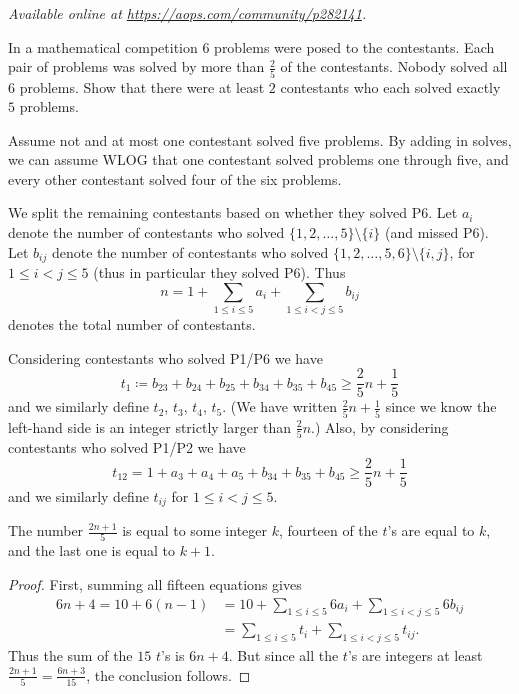 
\textsl{Available online at \url{https://aops.com/community/p282141}.}
\begin{mdframed}[style=mdpurplebox,frametitle={Problem statement}]
In a mathematical competition $6$ problems were posed to the contestants.
Each pair of problems was solved by more than $\frac{2}{5}$ of the contestants.
Nobody solved all 6 problems.
Show that there were at least $2$ contestants
who each solved exactly $5$ problems.
\end{mdframed}
Assume not and at most one contestant solved five problems.
By adding in solves,
we can assume WLOG that one contestant solved problems one through five,
and every other contestant solved four of the six problems.

We split the remaining contestants based on whether they solved P6.
Let $a_i$ denote the number of contestants who solved
$\{1,2,\dots,5\} \setminus \{i\}$ (and missed P6).
Let $b_{ij}$ denote the number of contestants who solved
$\{1,2,\dots,5,6\} \setminus \{i,j\}$, for $1 \le i < j \le 5$
(thus in particular they solved P6).
Thus
\[ n = 1 + \sum_{1 \le i \le 5} a_i + \sum_{1 \le i < j \le 5} b_{ij} \]
denotes the total number of contestants.

Considering contestants who solved P1/P6 we have
\[ t_1 \coloneqq b_{23} + b_{24} + b_{25} + b_{34} + b_{35} + b_{45} \ge \frac25n + \frac15 \]
and we similarly define $t_2$, $t_3$, $t_4$, $t_5$.
(We have written $\frac25n+\frac15$ since we know
the left-hand side is an integer strictly larger than $\frac25n$.)
Also, by considering contestants who solved P1/P2 we have
\[ t_{12} = 1 + a_{3} + a_{4} + a_{5} + b_{34} + b_{35} + b_{45}
  \ge \frac25n + \frac15 \]
and we similarly define $t_{ij}$ for $1 \le i < j \le 5$.

\begin{claim*}
  The number $\frac{2n+1}{5}$ is equal to some integer $k$,
  fourteen of the $t$'s are equal to $k$,
  and the last one is equal to $k+1$.
\end{claim*}
\begin{proof}
First, summing all fifteen equations gives
  \begin{align*}
    6n+4 = 10 + 6(n-1) &= 10
      + \sum_{1 \le i \le 5} 6a_i + \sum_{1 \le i < j \le 5} 6b_{ij} \\
      &= \sum_{1 \le i \le 5} t_i + \sum_{1 \le i < j \le 5} t_{ij}.
  \end{align*}
  Thus the sum of the $15$ $t$'s is $6n+4$.
  But since all the $t$'s are integers at least
  $\frac{2n+1}{5} = \frac{6n+3}{15}$, the conclusion follows.
\end{proof}

